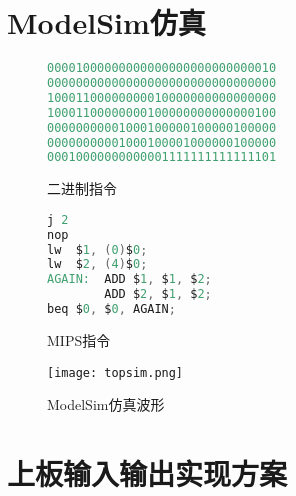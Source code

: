 \documentclass[a4paper]{article}
\begin{document}
\section{ModelSim仿真}
    \begin{figure}[hb]
        \begin{minipage}[t]{0.6\linewidth}
        \centering
            \begin{lstlisting}[language={Verilog}]
00001000000000000000000000000010
00000000000000000000000000000000
10001100000000010000000000000000
10001100000000100000000000000100
00000000001000100000100000100000
00000000001000100001000000100000
00010000000000001111111111111101  \end{lstlisting}
        \caption{二进制指令}
        \end{minipage}%
        \begin{minipage}[t]{0.4\linewidth}
        \centering
            \begin{lstlisting}[language={Verilog}]
j 2
nop
lw	$1,	(0)$0;
lw	$2, (4)$0;
AGAIN:  ADD $1, $1, $2;
        ADD $2, $1, $2;
beq $0, $0, AGAIN;   \end{lstlisting}
        \caption{MIPS指令}
        \end{minipage}
    \end{figure}

    \begin{figure}[hb]
    \centering
        \texttt{[image: topsim.png]}
    \caption{ModelSim仿真波形}
    \end{figure}

\section{上板输入输出实现方案}
\end{document}

